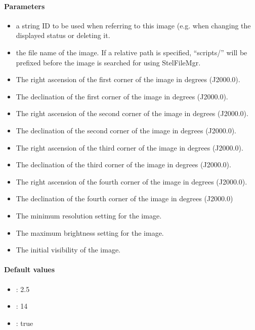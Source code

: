 \paragraph{Parameters}
\begin{itemize}
\item {} a string ID to be used when referring to this image (e.g. when changing the displayed status or deleting it.
\item {} the file name of the image. If a relative path is specified, ``scripts/'' will be prefixed before the image is searched for using StelFileMgr.
\item {} The right ascension of the first corner of the image in degrees (J2000.0).
\item {} The declination of the first corner of the image in degrees (J2000.0).
\item {} The right ascension of the second corner of the image in degrees (J2000.0).
\item {} 	The declination of the second corner of the image in degrees (J2000.0).
\item {} The right ascension of the third corner of the image in degrees (J2000.0).
\item {} The declination of the third corner of the image in degrees (J2000.0).
\item {} The right ascension of the fourth corner of the image in degrees (J2000.0).
\item {} The declination of the fourth corner of the image in degrees (J2000.0)
\item {} The minimum resolution setting for the image.
\item {} The maximum brightness setting for the image.
\item {} The initial visibility of the image.
\end{itemize}

\paragraph{Default values}
\begin{itemize}
\item {}: 2.5
\item {}: 14
\item {}: true
\end{itemize}

